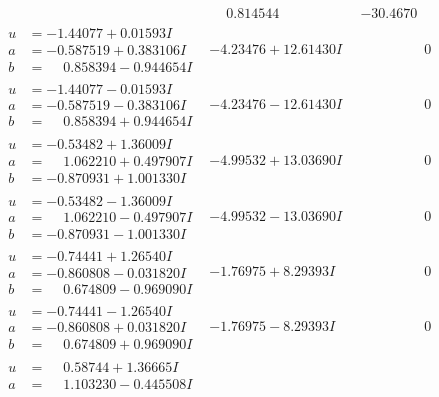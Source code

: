 \documentclass[1p]{elsarticle_modified}
\theoremstyle{definition}
\begin{document}
$$\begin{array}{c|c|c}
 & \phantom{-}0.814544\phantom{ +0.000000I} & -30.4670\phantom{ +0.000000I} \\ \hline\begin{aligned}
u &= -1.44077 + 0.01593 I \\
a &= -0.587519 + 0.383106 I \\
b &= \phantom{-}0.858394 - 0.944654 I\end{aligned}
 & -4.23476 + 12.61430 I & \phantom{-0.000000 } 0 \\ \hline\begin{aligned}
u &= -1.44077 - 0.01593 I \\
a &= -0.587519 - 0.383106 I \\
b &= \phantom{-}0.858394 + 0.944654 I\end{aligned}
 & -4.23476 - 12.61430 I & \phantom{-0.000000 } 0 \\ \hline\begin{aligned}
u &= -0.53482 + 1.36009 I \\
a &= \phantom{-}1.062210 + 0.497907 I \\
b &= -0.870931 + 1.001330 I\end{aligned}
 & -4.99532 + 13.03690 I & \phantom{-0.000000 } 0 \\ \hline\begin{aligned}
u &= -0.53482 - 1.36009 I \\
a &= \phantom{-}1.062210 - 0.497907 I \\
b &= -0.870931 - 1.001330 I\end{aligned}
 & -4.99532 - 13.03690 I & \phantom{-0.000000 } 0 \\ \hline\begin{aligned}
u &= -0.74441 + 1.26540 I \\
a &= -0.860808 - 0.031820 I \\
b &= \phantom{-}0.674809 - 0.969090 I\end{aligned}
 & -1.76975 + 8.29393 I & \phantom{-0.000000 } 0 \\ \hline\begin{aligned}
u &= -0.74441 - 1.26540 I \\
a &= -0.860808 + 0.031820 I \\
b &= \phantom{-}0.674809 + 0.969090 I\end{aligned}
 & -1.76975 - 8.29393 I & \phantom{-0.000000 } 0 \\ \hline\begin{aligned}
u &= \phantom{-}0.58744 + 1.36665 I \\
a &= \phantom{-}1.103230 - 0.445508 I \\

\end{aligned}
\end{array}$$
\end{document}
